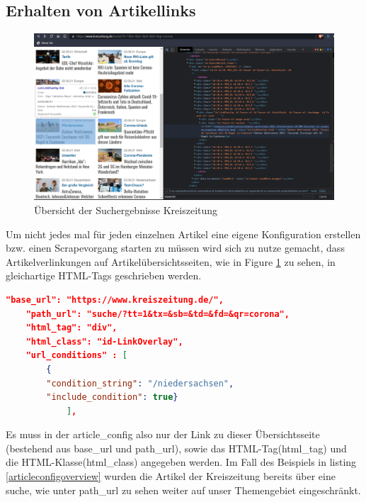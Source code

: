 \documentclass[12pt,oneside,a4paper,parskip]{scrbook}
\begin{document}
\subsection{Erhalten von Artikellinks}
\begin{figure}[h]
\caption{Übersicht der Suchergebnisse Kreiszeitung}
\label{articlelist}
\centering
\includegraphics[scale=0.4]{articles_list.png}
\end{figure}

Um nicht jedes mal für jeden einzelnen Artikel eine eigene Konfiguration erstellen bzw. einen Scrapevorgang starten zu müssen wird sich zu nutze gemacht, dass Artikelverlinkungen auf Artikelübersichtsseiten, wie in Figure \ref {articlelist} zu sehen, in gleichartige HTML-Tags geschrieben werden. 

\begin{lstlisting}[caption=article\_config für Übersichtsseite,label=articleconfigoverview,language=json]
    "base_url": "https://www.kreiszeitung.de/",
    "path_url": "suche/?tt=1&tx=&sb=&td=&fd=&qr=corona",
    "html_tag": "div",
    "html_class": "id-LinkOverlay",
    "url_conditions" : [
        {
        "condition_string": "/niedersachsen",
        "include_condition": true}
        	],
\end{lstlisting}

Es muss in der article\_config also nur der Link zu dieser Übersichtsseite (bestehend aus base\_url und path\_url), sowie das HTML-Tag(html\_tag) und die HTML-Klasse(html\_class) angegeben werden. Im Fall des Beispiels in listing \ref{articleconfigoverview} wurden die Artikel der Kreiszeitung bereits über eine suche, wie unter path\_url zu sehen weiter auf unser Themengebiet eingeschränkt. 
\pagebreak
\end{document}
